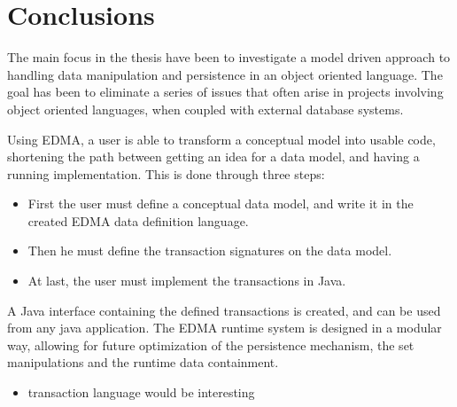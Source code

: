 
\section{Conclusions\label{sec:Conclusions}}

The main focus in the thesis have been to investigate a model driven
approach to handling data manipulation and persistence in an object
oriented language. The goal has been to eliminate a series of issues
that often arise in projects involving object oriented languages,
when coupled with external database systems.

Using EDMA, a user is able to transform a conceptual model into usable
code, shortening the path between getting an idea for a data model,
and having a running implementation. This is done through three steps: 
\begin{itemize}
\item First the user must define a conceptual data model, and write it in
the created EDMA data definition language. 
\item Then he must define the transaction signatures on the data model. 
\item At last, the user must implement the transactions in Java.
\end{itemize}
A Java interface containing the defined transactions is created, and
can be used from any java application. The EDMA runtime system is
designed in a modular way, allowing for future optimization of the
persistence mechanism, the set manipulations and the runtime data
containment.
\begin{itemize}
\item transaction language would be interesting\end{itemize}

